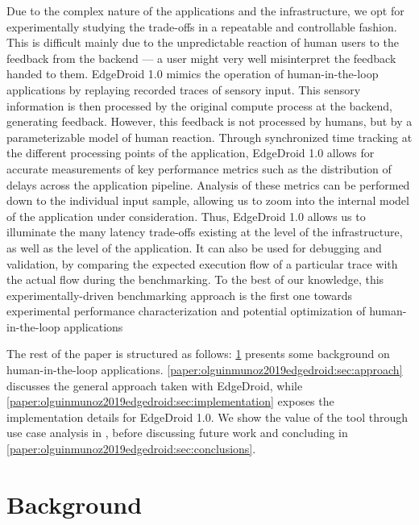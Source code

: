 Due to the complex nature of the applications and the infrastructure, we opt for experimentally studying the trade-offs in a repeatable and controllable fashion.
This is difficult mainly due to the unpredictable reaction of human users to the feedback from the backend --- a user might very well misinterpret the feedback handed to them.
EdgeDroid 1.0 mimics the operation of human-in-the-loop applications by replaying recorded traces of sensory input.
This sensory information is then processed by the original compute process at the backend, generating feedback.
However, this feedback is not processed by humans, but by a parameterizable model of human reaction.
Through synchronized time tracking at the different processing points of the application, EdgeDroid 1.0 allows for accurate measurements of key performance metrics such as the distribution of delays across the application pipeline.
Analysis of these metrics can be performed down to the individual input sample, allowing us to zoom into the internal model of the application under consideration.
Thus, EdgeDroid 1.0 allows us to illuminate the many latency trade-offs existing at the level of the infrastructure, as well as the level of the application.
It can also be used for debugging and validation, by comparing the expected execution flow of a particular trace with the actual flow during the benchmarking.
To the best of our knowledge, this experimentally-driven benchmarking approach is the first one towards experimental performance characterization and potential optimization of human-in-the-loop applications

The rest of the paper is structured as follows:
\cref{paper:olguinmunoz2019edgedroid:sec:background} presents some background on human-in-the-loop applications.
\cref{paper:olguinmunoz2019edgedroid:sec:approach} discusses the general approach taken with EdgeDroid, while \cref{paper:olguinmunoz2019edgedroid:sec:implementation} exposes the implementation details for EdgeDroid 1.0.
We show the value of the tool through use case analysis in , before discussing future work and concluding in \cref{paper:olguinmunoz2019edgedroid:sec:conclusions}.


\section{Background}\label{paper:olguinmunoz2019edgedroid:sec:background}

